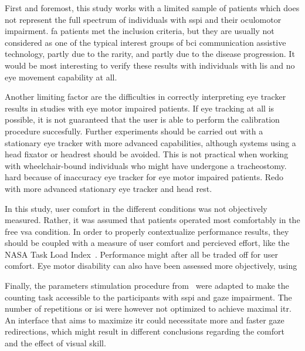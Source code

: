 First and foremost, this study works with a limited sample of patients which
does not represent the full spectrum of individuals with \ac{sspi} and their
oculomotor impairment.
\Ac{fa} patients met the inclusion criteria, but they are usually not
considered as one of the typical interest groups of \ac{bci} communication assistive
technology, partly due to the rarity, and partly due to the disease
progression.
It would be most interesting to verify these results with individuals with
\ac{lis} and no eye movement capability at all.


Another limiting factor are the difficulties in correctly interpreting eye tracker
results in studies with eye motor impaired patients.
If eye tracking at all is possible, it is not guaranteed that the user is able
to perform the calibration procedure succesfully.
Further experiments should be carried out with a stationary eye tracker with
more advanced capabilities, although systems using a head fixator or headrest
should be avoided.
This is not practical when working with
wheelchair-bound individuals who might have undergone a tracheostomy.
hard because of inaccuracy eye tracker for eye
motor impaired patients. Redo with more advanced stationary eye tracker and
head rest.

In this study, user comfort in the different conditions was not objectively
measured.
Rather, it was assumed that patients operated most comfortably in the free
\ac{vsa} condition.
In order to properly contextualize performance results, they should be coupled
with a measure of user comfort and percieved effort, like the NASA Task Load
Index~\cite{Hart2006}.
Performance might after all be traded off for user comfort.
Eye motor disability can also have been assessed more objectively, using 

Finally, the parameters stimulation procedure
from~\textcite{VanDenKerchove2024} were adapted to make the counting task
accessible to the participants with \ac{sspi} and gaze impairment.
The number of repetitions or \ac{isi} were however not optimized to achieve
maximal \ac{itr}.
An interface that aims to maximize \ac{itr} could necessitate more and faster
gaze redirections, which might result in different conclusions regarding the
comfort and the effect of visual skill.

